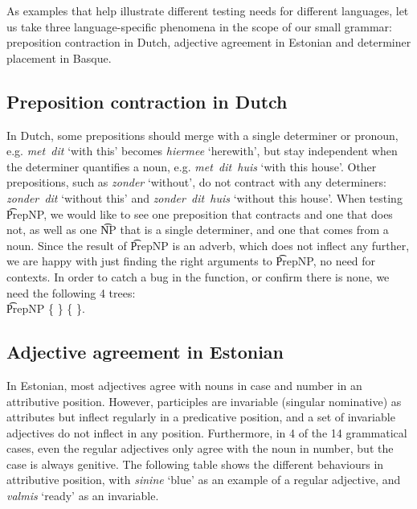 As examples that help illustrate different testing needs for different
languages, let us take three language-specific phenomena in the scope
of our small grammar: preposition contraction in Dutch, adjective agreement
in Estonian and determiner placement in Basque.

\subsection{Preposition contraction in Dutch} In Dutch, some prepositions should
merge with a single determiner or pronoun, e.g. \emph{met~dit} `with
this' becomes \emph{hiermee} `herewith', but stay independent when the
determiner quantifies a noun, e.g. \emph{met~dit~huis} `with this house'. 
Other prepositions, such as \emph{zonder} `without', do not
contract with any determiners: \emph{zonder~dit} `without this' and
\emph{zonder~dit~huis} `without this house'.
When testing \t{PrepNP}, we would like to see one preposition that
contracts and one that does not, as well as one \t{NP} that is a
single determiner, and one that comes from a noun. Since the result of
\t{PrepNP} is an adverb, which does not inflect any further, we are
happy with just finding the right arguments to \t{PrepNP}, no need for contexts.
In order to catch a bug in the function, or confirm there is none, we
need the following 4 trees: \\
\t{PrepNP} \{  \} 
           \{  \}. 

\subsection{Adjective agreement in Estonian} In Estonian,
most adjectives agree with nouns in case and number in an attributive
position. However, participles are invariable (singular nominative) as 
attributes but inflect regularly in a predicative position, and a set
of invariable adjectives do not inflect in any position. Furthermore,
in 4 of the 14 grammatical cases, even the regular adjectives only
agree with the noun in number, but the case is always genitive.
The following table shows the different behaviours in attributive
position, with \emph{sinine} `blue' as an example of a regular
adjective, and \emph{valmis} `ready' as an invariable.

